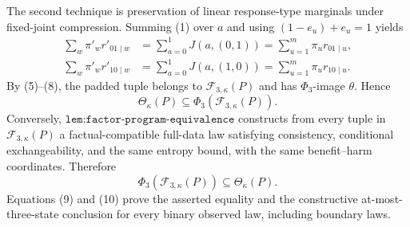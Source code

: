 The second technique is preservation of linear response-type marginals under fixed-joint compression.  Summing (1) over \(a\) and using \((1-e_u)+e_u=1\) yields
\[
\begin{aligned}
\sum_w\pi'_wr'_{01\mid w}
&=\sum_{a=0}^1J(a,(0,1))
=\sum_{u=1}^m\pi_ur_{01\mid u},\\
\sum_w\pi'_wr'_{10\mid w}
&=\sum_{a=0}^1J(a,(1,0))
=\sum_{u=1}^m\pi_ur_{10\mid u}.
\end{aligned}
\tag{8}
\]
By (5)--(8), the padded tuple belongs to \(\mathcal F_{3,\kappa}(P)\) and has \(\Phi_3\)-image \(\theta\).  Hence
\[
\Theta_\kappa(P)\subseteq\Phi_3(\mathcal F_{3,\kappa}(P)).
\tag{9}
\]
Conversely, \(\texttt{lem:factor-program-equivalence}\) constructs from every tuple in \(\mathcal F_{3,\kappa}(P)\) a factual-compatible full-data law satisfying consistency, conditional exchangeability, and the same entropy bound, with the same benefit--harm coordinates.  Therefore
\[
\Phi_3(\mathcal F_{3,\kappa}(P))\subseteq\Theta_\kappa(P).
\tag{10}
\]
Equations (9) and (10) prove the asserted equality and the constructive at-most-three-state conclusion for every binary observed law, including boundary laws.